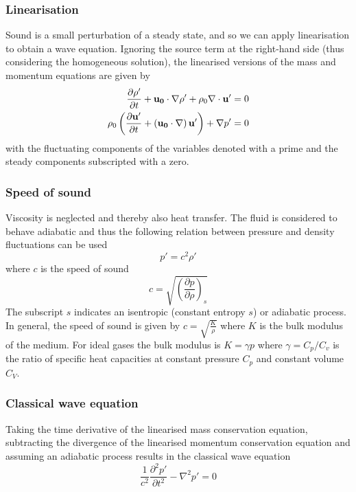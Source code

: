 \subsubsection*{Linearisation}
Sound is a small perturbation of a steady state, and so we can apply
linearisation to obtain a wave equation. Ignoring the source term at the
right-hand side (thus considering the homogeneous solution), the linearised
versions of the mass and momentum equations are given by
\begin{align}
 \frac{\partial \rho'}{\partial t} + \mathbf{u_0} \cdot \nabla \rho' + \rho_0 \nabla \cdot \mathbf{u'} = 0  \label{eq:theory:sound:linearisation:mass} \\
 \rho_0 \left( \frac{\partial \mathbf{u'}}{\partial t} + \left(\mathbf{u_0} \cdot \nabla \right) \mathbf{u'}\right) + \nabla p' = 0 \label{eq:theory:sound:linearisation:momentum}
\end{align}
with the fluctuating components of the variables denoted with a prime and the
steady components subscripted with a zero.

\subsubsection*{Speed of sound}
Viscosity is neglected and thereby also heat transfer. The fluid is considered
to behave adiabatic and thus the following relation between pressure and density
fluctuations can be used
\begin{equation}
  p' = c^2 \rho'
\end{equation}
where $c$ is the speed of sound
\begin{equation}
  c = \sqrt{ \left( \frac{\partial p}{\partial \rho} \right)_{s} }
\end{equation}
The subscript $s$ indicates an isentropic (constant entropy $s$) or adiabatic process.
In general, the speed of sound is given by $c = \sqrt{\frac{K}{\rho}}$ where $K$
is the bulk modulus of the medium. For ideal gases the bulk modulus is $K=\gamma
p$ where $\gamma=C_p/C_v$ is the ratio of specific heat capacities at constant
pressure $C_p$ and constant volume $C_V$.

\subsubsection*{Classical wave equation}
Taking the time derivative of the linearised mass conservation equation,
subtracting the divergence of the linearised momentum conservation equation
and assuming an adiabatic process results in the classical wave equation
\begin{equation}\label{eq:theory:sound:wave:classic}
 \frac{1}{c^2} \frac{\partial^2 p'}{\partial t^2} - \nabla^2 p' = 0
\end{equation}

